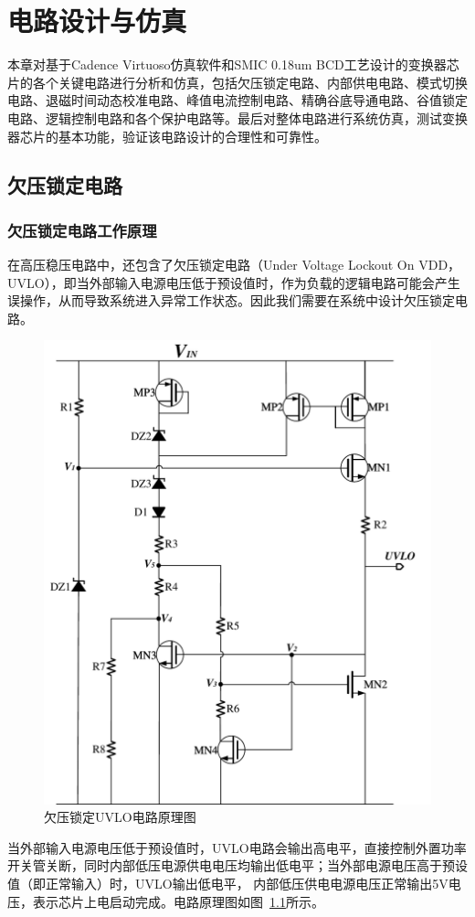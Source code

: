 \chapter{电路设计与仿真}

本章对基于Cadence Virtuoso仿真软件和SMIC 0.18um BCD工艺设计的变换器芯片的各个关键电路进行分析和仿真，包括欠压锁定电路、内部供电电路、模式切换电路、退磁时间动态校准电路、峰值电流控制电路、精确谷底导通电路、谷值锁定电路、逻辑控制电路和各个保护电路等。最后对整体电路进行系统仿真，测试变换器芯片的基本功能，验证该电路设计的合理性和可靠性。

\section{欠压锁定电路}

\subsection{欠压锁定电路工作原理}

在高压稳压电路中，还包含了欠压锁定电路（Under Voltage Lockout On VDD， UVLO），即当外部输入电源电压低于预设值时，作为负载的逻辑电路可能会产生误操作，从而导致系统进入异常工作状态。因此我们需要在系统中设计欠压锁定电路。

\begin{figure}[htbp] 
    \centering
    \includegraphics[width=0.6\linewidth]{figures/UVLO.pdf}
    \caption{欠压锁定UVLO电路原理图}
    \label{fig:UVLO电路}
\end{figure}

当外部输入电源电压低于预设值时，UVLO电路会输出高电平，直接控制外置功率开关管关断，同时内部低压电源供电电压均输出低电平；当外部电源电压高于预设值（即正常输入）时，UVLO输出低电平， 内部低压供电电源电压正常输出5V电压，表示芯片上电启动完成。电路原理图如图~\ref{fig:UVLO电路}所示。

